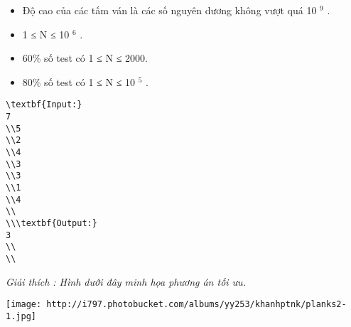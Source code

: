 \begin{itemize}
	\item     Độ cao của các tấm ván là các số nguyên dương không vượt quá 10    $^     9    $    .   
	\item     1 ≤ N ≤ 10    $^     6    $    .   
	\item     60\% số test có 1 ≤ N ≤ 2000.   
	\item     80\% số test có 1 ≤ N ≤ 10    $^     5    $    .   
\end{itemize}
\begin{verbatim}
\textbf{Input:}
7
\\5
\\2
\\4
\\3
\\3
\\1
\\4
\\
\\\textbf{Output:}
3
\\
\\\end{verbatim}

\emph{     Giải thích        : Hình dưới đây minh họa phương án tối ưu.   }


\texttt{[image: http://i797.photobucket.com/albums/yy253/khanhptnk/planks2-1.jpg]}